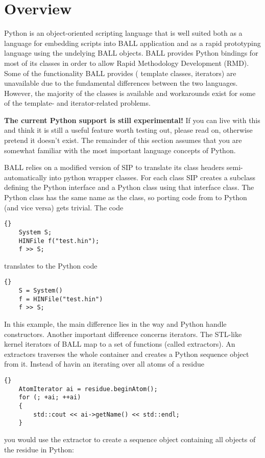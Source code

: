 \section{Overview}
Python is an object-oriented scripting language\cite{Python} that is well
suited both as a language for embedding scripts into BALL application and as a
rapid prototyping language using the undelying BALL objects.
BALL provides Python bindings for most of its classes in order to allow Rapid
Methodology Development (RMD). Some of the functionality BALL provides (\eg
template classes, iterators) are unavailable due to the fundamental differences 
between the two languages. However, the majority of the classes is available and
workarounds exist for some of the template- and iterator-related problems.

{\bf The current Python support is still experimental!} If you can live with
this and think it is still a useful feature worth testing out, please read on,
otherwise pretend it doesn't exist. The remainder of this section assumes that
you are somewhat familiar with the most important language concepts of Python.

BALL relies on a modified version of SIP \cite{SIP} to translate its class
headers semi-automatically into python wrapper classes. For each \CPP class
SIP creates a subclass defining the Python interface and a Python class
using that \CPP interface class. The Python class has the same name as the
\CPP class, so porting code from \CPP to Python (and vice versa) gets trivial.
The \CPP code 

\begin{lstlisting}{}
	System S;
	HINFile f("test.hin");
	f >> S;
\end{lstlisting}

\noindent
translates to the Python code

\begin{lstlisting}{}
	S = System()
	f = HINFile("test.hin")
	f >> S;
\end{lstlisting}

\noindent
In this example, the main difference lies in the way \CPP and Python handle
constructors. Another important difference concerns iterators. The STL-like
kernel iterators of BALL map to a set of functions (called extractors). An
extractors traverses the whole container and creates a Python sequence object
from it. Instead of havin an  iterating over all atoms of
a residue

\begin{lstlisting}{}
	AtomIterator ai = residue.beginAtom();
	for (; +ai; ++ai)
	{
		std::cout << ai->getName() << std::endl;
	}
\end{lstlisting}
\noindent you would use the  extractor to create a sequence
object containing all objects of the residue in Python:

